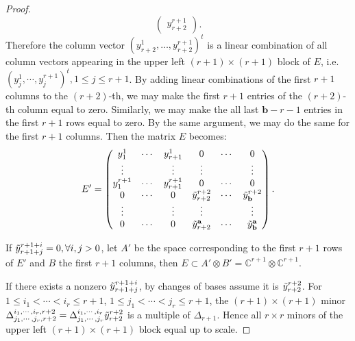 \documentclass[10pt]{article} %
\newcommand{\aaa}{\mathbf{a}}
\newcommand{\bbb}{\mathbf{b}}
\theoremstyle{definition}
\begin{document}
\begin{proof}
$$\begin{pmatrix}
y^{r+1}_{r+2}
\end{pmatrix}.$$
Therefore the column vector $(y^1_{r+2},\dots,y^{r+1}_{r+2})^t$ is a linear combination
of all column vectors appearing in the upper left $(r+1)\times (r+1)$ block of $E$, i.e.  $(y^1_{j},\cdots,y^{r+1}_{j})^t, 1\leq j\leq r+1$. By adding linear combinations
of the first $r+1$ columns to the $(r+2)$-th, we may make the first $r+1$ entries of the $(r+2)$-th column equal to zero. Similarly, we may make
the all last $\bbb-r-1$ entries in the first $r+1$ rows equal to zero. By the same argument, we may do 
the same for the first $r+1$ columns. Then the matrix $E$ becomes:
\begin{equation}\label{E'}
E'=\begin{pmatrix}
y^1_1 & \cdots & y^1_{r+1} & 0 & \cdots & 0\\
\vdots &      & \vdots & \vdots &  &\vdots\\
y^{r+1}_1 & \cdots & y^{r+1}_{r+1} & 0 & \cdots & 0\\
0 & \cdots & 0 & \Tilde{y}^{r+2}_{r+2} & \cdots & \Tilde{y}^{r+2}_{\bbb}\\
\vdots &  & \vdots & \vdots &   & \vdots\\
0 & \cdots & 0 & \Tilde{y}^{\aaa}_{r+2} & \cdots & \Tilde{y}^{\aaa}_{\bbb}
\end{pmatrix}.
\end{equation}

If $\Tilde{y}^{r+1+i}_{r+1+j}=0,\forall i,j>0$, let $A'$ be the space corresponding to the first $r+1$ rows of $E'$ and $B$ the first $r+1$ columns, then $E\subset A'\otimes B'=\mathbb{C}^{r+1}\otimes\mathbb{C}^{r+1}$.

If there exists a nonzero $\Tilde{y}^{r+1+i}_{r+1+j}$, by changes of bases assume it is $\Tilde{y}^{r+2}_{r+2}$. For $1\leq i_1<\cdots<i_{r}\leq r+1$, $1\leq j_1<\cdots<j_{r}\leq r+1$, the $(r+1)\times (r+1)$ minor $\Delta^{i_1,\cdots,i_{r},r+2}_{j_1,\cdots,j_{r},r+2}=\Delta^{i_1,\cdots,i_{r}}_{j_1,\cdots,j_{r}}\Tilde{y}^{r+2}_{r+2}$ is a multiple of $\Delta_{r+1}$. Hence all $r\times r$ minors of the upper left $(r+1)\times (r+1)$ block equal up to scale. 


\end{proof}
\end{document}
